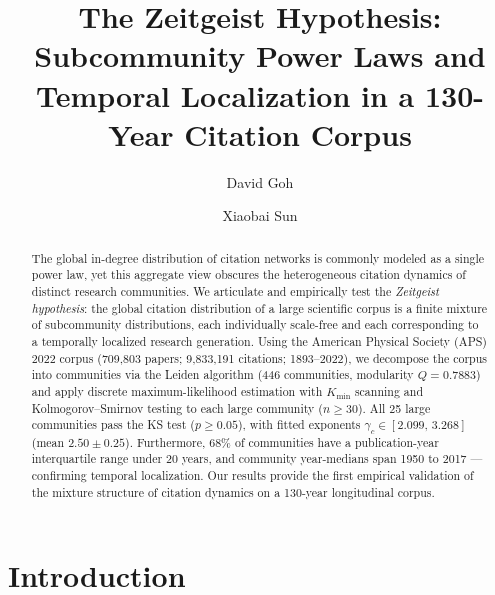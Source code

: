 \documentclass[runningheads]{llncs}
\begin{document}
\title{The Zeitgeist Hypothesis: Subcommunity Power Laws and\\
Temporal Localization in a 130-Year Citation Corpus}

\author{David Goh \and Xiaobai Sun}



\maketitle

\begin{abstract}
The global in-degree distribution of citation networks is commonly modeled as a
single power law, yet this aggregate view obscures the heterogeneous citation
dynamics of distinct research communities.  We articulate and empirically test
the \emph{Zeitgeist hypothesis}: the global citation distribution of a large
scientific corpus is a finite mixture of subcommunity distributions, each
individually scale-free and each corresponding to a temporally localized
research generation.  Using the American Physical Society (APS) 2022 corpus
(709,803 papers; 9,833,191 citations; 1893--2022), we decompose the corpus into
communities via the Leiden algorithm (446 communities, modularity $Q=0.7883$)
and apply discrete maximum-likelihood estimation with $K_{\min}$ scanning and
Kolmogorov--Smirnov testing to each large community ($n \geq 30$).  All 25
large communities pass the KS test ($p \geq 0.05$), with fitted exponents
$\gamma_c \in [2.099,\, 3.268]$ (mean $2.50 \pm 0.25$).  Furthermore, 68\% of
communities have a publication-year interquartile range under 20 years, and
community year-medians span 1950 to 2017 --- confirming temporal localization.
Our results provide the first empirical validation of the mixture structure of
citation dynamics on a 130-year longitudinal corpus.
\end{abstract}


\section{Introduction}
\label{sec:intro}
\end{document}

